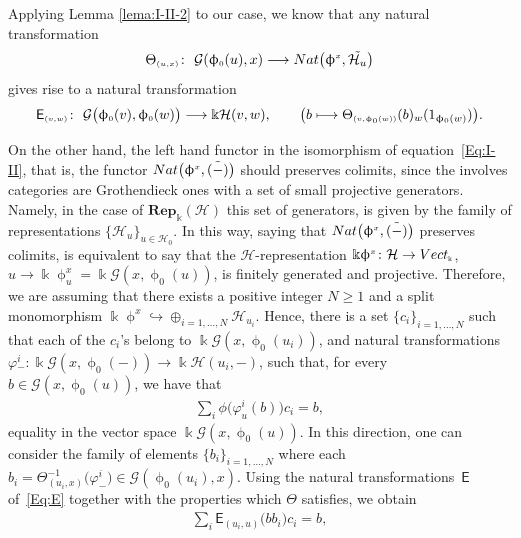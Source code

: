 \documentclass[11pt]{article}
\numberwithin{equation}{section}
\newcommand{\Sf}[1]{\mathsf{#1}}
\newcommand{\Rep}[1]{\mathbf{Rep}_{\Sscript{\Bbbk}}(#1)}
\newcommand{\Vect}{{\rm Vect}_{\Sscript{\Bbbk}}}
\newcommand{\Ho}{\cH_{\Sscript{0}}}
\newcommand{\cG}{{\mathcal G}}
\newcommand{\cH}{{\mathcal H}}
\newcommand{\Sscript}[1]{\scriptscriptstyle{#1}}
\newcommand{\phio}{\upphi_{\Sscript{0}}}
\begin{document}
Applying Lemma \ref{lema:I-II-2} to our case, we know that any natural transformation
\begin{gather*}
\Theta_{\Sscript{(u,x)}}\colon \ \cG(\phio(u),x) \longrightarrow {\rm Nat}\big( \upphi^{\Sscript{x}}, \tilde{\cH_{u}}\big)
\end{gather*}
gives rise to a natural transformation
\begin{gather}\label{Eq:E}
{\sf{E}}_{\Sscript{(v,w)}}\colon \ \cG\big(\phio(v),\phio(w)\big) \longrightarrow \Bbbk\cH(v,w), \qquad \big( b \longmapsto \Theta_{\Sscript{(v,\phio(w))}}(b){}_{w}(1_{\phio(w)}) \big).
\end{gather}

On the other hand, the left hand functor in the isomorphism of equation~\eqref{Eq:I-II}, that is, the functor ${\rm Nat}\big(\upphi^{\Sscript{x}}, \tilde{(-)}\big)$ should preserves colimits, since the involves categories are Grothendieck ones with a set of small projective generators. Namely, in the case of $\Rep{\cH}$ this set of generators, is given by the family of representations $\{ \cH_{\Sscript{u}}\}_{\Sscript{u \in \Ho}}$. In this way, saying that ${\rm Nat}\big(\upphi^{\Sscript{x}}, \tilde{(-)}\big)$ preserves colimits, is equivalent to say that the $\cH$-representation $\Bbbk \upphi^{\Sscript{x}}\colon \cH \to \Vect$, $u \to \Bbbk \upphi^{\Sscript{x}}_{\Sscript{u}}=\Bbbk\cG(x,\phio(u))$, is finitely generated and projective. Therefore, we are assuming that there exists a positive integer $N \geq 1$ and a split monomorphism $\Bbbk \upphi^{\Sscript{x}} \hookrightarrow \oplus_{i =1,\dots, N} \cH_{\Sscript{u_{i}}}$. Hence, there is a set $\{ c_{i}\}_{\Sscript{i =1,\dots, N}}$ such that each of the $c_{i}$'s belong to $\Bbbk \cG(x, \phio(u_{i}))$, and natural transformations $\varphi{}^{i}_{-}\colon \Bbbk \cG(x,\phio(-)) \to \Bbbk \cH(u_{i},-)$, such that, for every $b \in \cG(x,\phio(u))$, we have that
\begin{gather*}
\sum_{i} \phi\big( \varphi^{i}_{u}(b) \big) c_{i} = b,
\end{gather*}
equality in the vector space $ \Bbbk\cG(x,\phio(u))$. In this direction, one can consider the family of elements $\{b_{i}\}_{\Sscript{i= 1,\dots, N}}$ where each $b_{i} = \Theta_{(u_{i}, x)}^{-1}\big( \varphi^{i}_{-}\big) \in \cG(\phio(u_{i}),x)$. Using the natural transformations~$\Sf{E}$ of~\eqref{Eq:E} together with the properties which $\Theta$ satisfies, we obtain
\begin{gather*}
\sum_{i} \Sf{E}_{\Sscript{(u_{i}, u)}} \big( bb_{i}\big) c_{i} = b,
\end{gather*}
\end{document}
